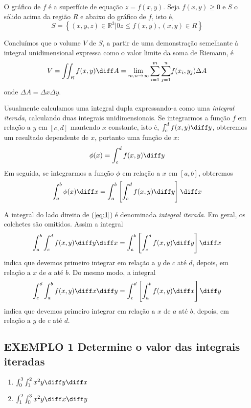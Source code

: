 \documentclass[a4paper, 12pt]{extreport}
\begin{document}
    O gráfico de $f$ é a superfície de equação $z = f(x,y)$. Seja $f(x,y) \geqslant 0$ e $S$ o sólido acima da região $R$ e abaixo do gráfico de $f$, isto é,
    $$ S = \left\{(x,y,z) \in \mathbb{R}^3 | 0 z \leqslant f(x,y), (x,y) \in R \right\} $$

    Concluímos que o volume $V$ de $S$, a partir de uma demonstração semelhante à integral unidimensional expressa como o valor limite da soma de Riemann, é
    $$ V = \iint_R{f(x,y)\diff A} = \lim_{m,n \to \infty}{\sum_{i=1}^m{\sum_{j=1}^n}{f(x_i,y_j)\Delta A}} $$
    onde $\Delta A = \Delta x\Delta y$.

    Usualmente calculamos uma integral dupla expressando-a como uma \textsl{integral iterada}, calculando duas integrais unidimensionais.
    Se integrarmos a função $f$ em relação a $y$ em $[c,d]$ mantendo $x$ constante, isto é, $\int_c^d{f(x,y)\diff y}$, obteremos um resultado dependente de $x$,
    portanto uma função de $x$:
    $$ \phi (x) = \int_c^d{f(x,y)\diff y} $$
    Em seguida, se integrarmos a função $\phi$ em relação a $x$ em $[a,b]$, obteremos
    \begin{equation} \label{eq:1}
      \int_a^b{\phi (x)\diff x} = \int_a^b{\left[\int_c^d{f(x,y)\diff y}\right]\diff x}
    \end{equation}

    A integral do lado direito de (\ref{eq:1}) é denominada \textsl{integral iterada}. Em geral, os colchetes são omitidos. Assim a integral
    \begin{equation}
      \int_a^b{\int_c^d{f(x,y)\diff y}\diff x} = \int_a^b{\left[\int_c^d{f(x,y)\diff y}\right]\diff x}
    \end{equation}
    indica que devemos primeiro integrar em relação a $y$ de $c$ até $d$, depois, em relação a $x$ de $a$ até $b$. Do mesmo modo, a integral
    \begin{equation}
      \int_c^d{\int_a^b{f(x,y)\diff x}\diff y} = \int_c^d{\left[\int_a^b{f(x,y)\diff x}\right]\diff y}
    \end{equation}
    indica que devemos primeiro integrar em relação a $x$ de $a$ até $b$, depois, em relação a $y$ de $c$ até $d$.

    \newpage

    \subsection*{\small {\color{astral}EXEMPLO 1} \textmd{Determine o valor das integrais iteradas}}
      \begin{multicols}{2}
        \begin{enumerate}
          \renewcommand{\theenumi}{(\alph{enumi})}
          \item $\int_0^3{\int_1^2{x^2y}\diff y}\diff x$
          \item $\int_1^2{\int_0^3{x^2y}\diff x}\diff y$
        \end{enumerate}
      \end{multicols}
\end{document}
